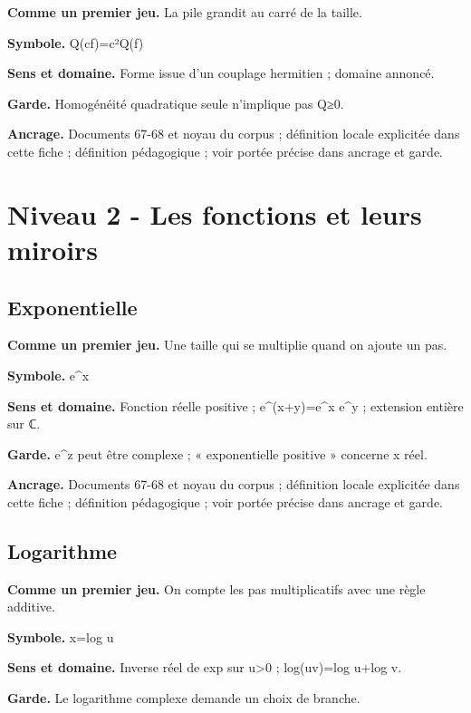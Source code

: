 \documentclass[
  9pt,
  a4paper,
]{article}
\begin{document}
\textbf{Comme un premier jeu.} La pile grandit au carré de la taille.

\textbf{Symbole.} Q(cf)=\textbar c\textbar²Q(f)

\textbf{Sens et domaine.} Forme issue d'un couplage hermitien ; domaine
annoncé.

\textbf{Garde.} Homogénéité quadratique seule n'implique pas Q≥0.

\textbf{Ancrage.} Documents 67-68 et noyau du corpus ; définition locale
explicitée dans cette fiche ; définition pédagogique ; voir portée
précise dans ancrage et garde.

\hypertarget{niveau-2---les-fonctions-et-leurs-miroirs}{%
\section{Niveau 2 - Les fonctions et leurs
miroirs}\label{niveau-2---les-fonctions-et-leurs-miroirs}}

\hypertarget{exponentielle}{%
\subsection{Exponentielle}\label{exponentielle}}

\textbf{Comme un premier jeu.} Une taille qui se multiplie quand on
ajoute un pas.

\textbf{Symbole.} e\^{}x

\textbf{Sens et domaine.} Fonction réelle positive ; e\^{}(x+y)=e\^{}x
e\^{}y ; extension entière sur ℂ.

\textbf{Garde.} e\^{}z peut être complexe ; « exponentielle positive »
concerne x réel.

\textbf{Ancrage.} Documents 67-68 et noyau du corpus ; définition locale
explicitée dans cette fiche ; définition pédagogique ; voir portée
précise dans ancrage et garde.

\hypertarget{logarithme}{%
\subsection{Logarithme}\label{logarithme}}

\textbf{Comme un premier jeu.} On compte les pas multiplicatifs avec une
règle additive.

\textbf{Symbole.} x=log u

\textbf{Sens et domaine.} Inverse réel de exp sur u\textgreater0 ;
log(uv)=log u+log v.

\textbf{Garde.} Le logarithme complexe demande un choix de branche.
\end{document}
